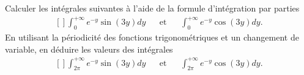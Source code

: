 \begin{exercice}\label{exoIntegralesMultiples0014}

Calculer les intégrales suivantes à l'aide de la formule d'intégration par parties
\begin{equation}
	\begin{aligned}[]
		\int _0^ {+\infty} e^{-y} \sin (3y)dy&&\text{et}&&\int _0^ {+\infty} e^{-y} \cos(3y)dy.
	\end{aligned}
\end{equation}
En utilisant la périodicité des fonctions trigonométriques et un changement de variable, en déduire les valeurs des intégrales
\begin{equation}
	\begin{aligned}[]
		\int _{2\pi}^{+\infty} e^{-y} \sin(3y)dy&&\text{et}&&\int _{2\pi}^{+\infty} e^{-y} \cos(3y)dy.
	\end{aligned}
\end{equation}

\end{exercice}
